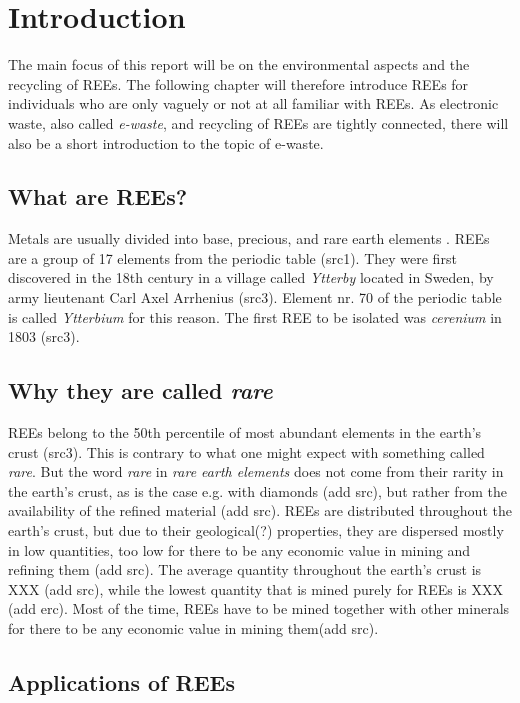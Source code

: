 
\section{Introduction}
The main focus of this report will be on the environmental aspects and the recycling of REEs. The following chapter will therefore introduce REEs for individuals who are only vaguely or not at all familiar with REEs. As electronic waste, also called \textit{e-waste}, and recycling of REEs are tightly connected, there will also be a short introduction to the topic of e-waste. 

\subsection{What are REEs?}

Metals are usually divided into base, precious, and rare earth elements \cite{javed2024}. REEs are a group of 17 elements from the periodic table (src1). They were first discovered in the 18th century in a village called \textit{Ytterby} located in Sweden, by army lieutenant Carl Axel Arrhenius (src3). Element nr. 70 of the periodic table is called \textit{Ytterbium} for this reason. The first REE to be isolated was \textit{cerenium} in 1803 (src3).  

\subsection{Why they are called \textit{rare}}

REEs belong to the 50th percentile of most abundant elements in the earth's crust (src3). This is contrary to what one might expect with something called \textit{rare}. But the word \textit{rare} in \textit{rare earth elements} does not come from their rarity in the earth's crust, as is the case e.g. with diamonds (add src), but rather from the availability of the refined material (add src).  REEs are distributed throughout the earth's crust, but due to their geological(?) properties, they are dispersed mostly in low quantities, too low for there to be any economic value in mining and refining them (add src). The average quantity throughout the earth's crust is XXX (add src), while the lowest quantity that is mined purely for REEs is XXX (add erc). Most of the time, REEs have to be mined together with other minerals for there to be any economic value in mining them(add src). 

\subsection{Applications of REEs}

